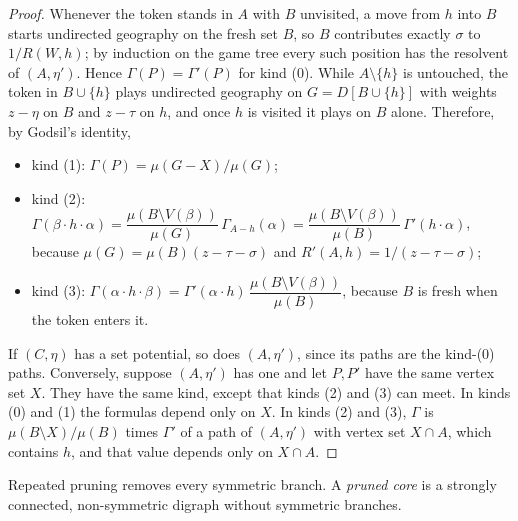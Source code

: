 \documentclass[final]{siamart0516}
\numberwithin{theorem}{section}
\numberwithin{equation}{section}
\theoremstyle{siamnonum}
\theoremstyle{plain}
\begin{document}
\begin{proof}
Whenever the token stands in $A$ with $B$ unvisited, a move from $h$ into $B$ starts undirected geography on the fresh set $B$, so $B$ contributes exactly $\sigma$ to $1/R(W,h)$; by induction on the game tree every such position has the resolvent of $(A,\eta')$. Hence $\Gamma(P)=\Gamma'(P)$ for kind (0). While $A\setminus\{h\}$ is untouched, the token in $B\cup\{h\}$ plays undirected geography on $G=D[B\cup\{h\}]$ with weights $z-\eta$ on $B$ and $z-\tau$ on $h$, and once $h$ is visited it plays on $B$ alone. Therefore, by Godsil's identity,
\begin{itemize}
\item kind (1): $\Gamma(P)=\mu(G-X)/\mu(G)$;
\item kind (2): $\Gamma(\beta\cdot h\cdot\alpha)=\dfrac{\mu(B\setminus V(\beta))}{\mu(G)}\,\Gamma_{A-h}(\alpha)=\dfrac{\mu(B\setminus V(\beta))}{\mu(B)}\,\Gamma'(h\cdot\alpha)$, because $\mu(G)=\mu(B)(z-\tau-\sigma)$ and $R'(A,h)=1/(z-\tau-\sigma)$;
\item kind (3): $\Gamma(\alpha\cdot h\cdot\beta)=\Gamma'(\alpha\cdot h)\,\dfrac{\mu(B\setminus V(\beta))}{\mu(B)}$, because $B$ is fresh when the token enters it.
\end{itemize}
If $(C,\eta)$ has a set potential, so does $(A,\eta')$, since its paths are the kind-(0) paths. Conversely, suppose $(A,\eta')$ has one and let $P,P'$ have the same vertex set $X$. They have the same kind, except that kinds (2) and (3) can meet. In kinds (0) and (1) the formulas depend only on $X$. In kinds (2) and (3), $\Gamma$ is $\mu(B\setminus X)/\mu(B)$ times $\Gamma'$ of a path of $(A,\eta')$ with vertex set $X\cap A$, which contains $h$, and that value depends only on $X\cap A$.
\end{proof}

Repeated pruning removes every symmetric branch. A \emph{pruned core} is a strongly connected, non-symmetric digraph without symmetric branches.
\end{document}
